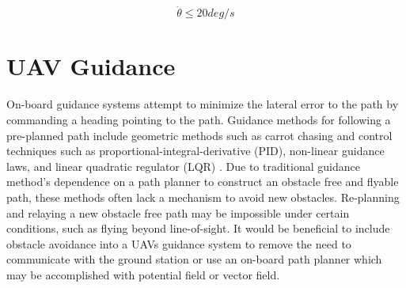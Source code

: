 \documentclass[numbered,pdftex]{ohio-etd}
\begin{document}
\begin{equation}
\label{turnRate}
\dot{\theta} \leq 20 deg/s
\end{equation}


\section{UAV Guidance}
On-board guidance systems attempt to minimize the lateral error to the path by commanding a heading pointing to the path. Guidance methods for following a pre-planned path include geometric methods such as carrot chasing \cite{manjunath_application_2016} and control techniques such as proportional-integral-derivative (PID), non-linear guidance laws, and linear quadratic regulator (LQR) \cite{sujit_unmanned_2014}. Due to traditional guidance method's dependence on a path planner to construct an obstacle free and flyable path, these methods often lack a mechanism to avoid new obstacles. Re-planning and relaying a new obstacle free path may be impossible under certain conditions, such as flying beyond line-of-sight. It would be beneficial to include obstacle avoidance into a UAVs guidance system to remove the need to communicate with the ground station or use an on-board path planner which may be accomplished with potential field or vector field. \\
\end{document}
